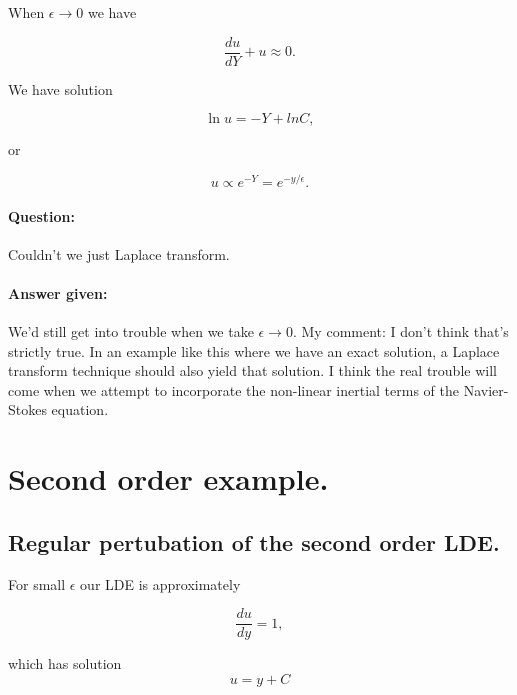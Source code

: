 When $\epsilon \rightarrow 0$ we have

\begin{equation}\label{eqn:continuumL20:250}
\frac{du}{dY} + u \approx 0.
\end{equation}

We have solution

\begin{equation}\label{eqn:continuumL20:270}
\ln u = -Y + ln C,
\end{equation}

or

\begin{equation}\label{eqn:continuumL20:290}
u \propto e^{-Y} = e^{-y/\epsilon}.
\end{equation}

\paragraph{Question:} Couldn't we just Laplace transform.
\paragraph{Answer given:} We'd still get into trouble when we take $\epsilon \rightarrow 0$.  My comment: I don't think that's strictly true.  In an example like this where we have an exact solution, a Laplace transform technique should also yield that solution.  I think the real trouble will come when we attempt to incorporate the non-linear inertial terms of the Navier-Stokes equation.

\section{Second order example.}

\subsection{Regular pertubation of the second order LDE.}

For small $\epsilon$ our LDE is approximately

\begin{equation}\label{eqn:continuumL20:n}
\frac{du}{dy} = 1,
\end{equation}

which has solution
\begin{equation}\label{eqn:continuumL20:n}
u = y + C 
\end{equation}

